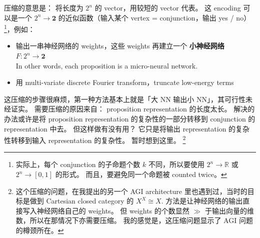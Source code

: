 \documentclass[orivec]{article}
\newcommand{\cc}[2]{#1}
\newcommand{\cc}[2]{#2}
\newcommand{\vect}[1]{\boldsymbol{#1}}
\begin{document}
\cc{
压缩的意思是： 将长度为 $2^n$ 的 vector，用较短的 vector 代表。  这 encoding 可以是一个 $2^n \rightarrow \vect{2}$ 的近似函数（输入某个 vertex = conjunction，输出 yes / no）\footnote{实际上，每个 conjunction 的子命题个数 $k$ 不同，所以要使用 $2^n \rightarrow \mathbb{R}$ 或 $2^n \rightarrow [0,1]$ 的形式。 而且，要避免同一个命题被 counted twice。}，例如：}{
Compression means to encode the vector of length $2^n$ by a shorter vector.  This encoding could be an approximating function $f: 2^n \rightarrow \vect{2}$ (input is a certain vertex = conjunction, output = yes / no) \footnote{In practice, a conjunction may have a variable number $k$ of conjuncts, so we may need to use $2^n \rightarrow \mathbb{R}$ or $2^n \rightarrow [0,1]$.  Also, we need to avoid counting a proposition twice in the proposition pool.}, for example:
}
\begin{itemize}
	\item \cc{输出一串神经网络的 weights，这些 weights 再建立一个 \textbf{小神经网络} $F: 2^n \rightarrow \vect{2}$ \\}
	{NN outputs a series of weights, which constructs a \textbf{small neural network} $F: 2^n \rightarrow \vect{2}$ \\}
	In other words, each proposition is a micro-neural network.
	\item \cc{用}{use} multi-variate discrete Fourier transform，truncate low-energy terms
\end{itemize}
\cc{
这压缩的步骤很麻烦，第一种方法基本上就是「大 NN 输出小 NN」，其可行性未经证实。  需要压缩的原因来自： proposition representation 的长度太长。  解决的办法或许是将 proposition representation 的复杂性的一部分转移到 conjunction 的 representation 中去。 但这样做有没有用？ 它只是将输出 representation 的复杂性转移到输入 representation 的复杂性。 暂时想到这里。 \footnote{这个压缩的问题，在我提出的另一个 AGI architecture 里也遇到过，当时的目标是做到 Cartesian closed category 的 $X^X \cong X$.  方法是让神经网络的输出直接写入神经网络自己的 weights。 但 weights 的个数显然 $\gg$ 于输出向量的维数，所以在那情况下亦需要压缩。 我的感觉是，这压缩问题显示了 AGI 问题的樽颈所在。}}{
This compression step is rather troublesome.  The first method is essentially to ``use big NN to output small NNs'', whose workability remains to be proven.  The need for compression comes from the too-long length of the proposition representation.  One idea is to transfer the complexity of the proposition representation to the conjunction representation.  But is this useful?  We'd just be transferring the complexity from the output representation to the input representation of the same NN.  This is my thinking so far.  \footnote{About this compression problem, I have previously encountered it in a similar form, while designing a different AGI architecture.  Then, my goal was to achieve $X^X \cong X$ of a Cartesian closed category.  My solution is to let the NN write to its own weights.  But the number of weights in an NN is clearly $\gg$ the dimension of the output vector, so we needed compression in that situation as well.  My feeling is that the need for compression is an indication of the AGI bottleneck.}
}
\end{document}
